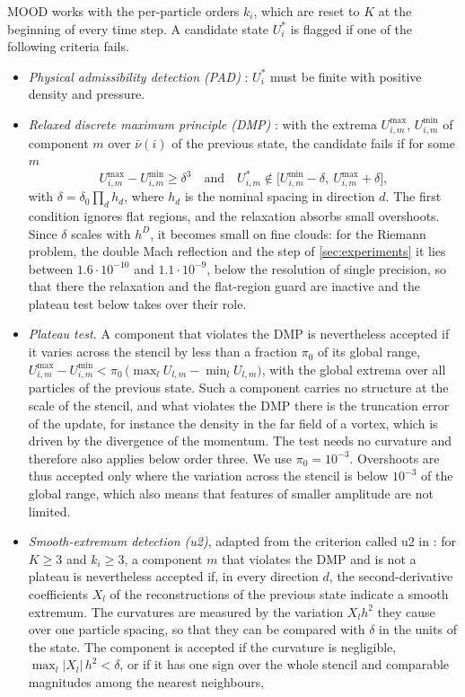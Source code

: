 \documentclass[11pt,a4paper]{article}
\numberwithin{equation}{section}
\newcommand{\cnb}{\bar\nu}
\begin{document}
MOOD works with the per-particle orders $k_i$, which are reset to $K$ at the beginning of every time step. A candidate state $U^*_i$ is flagged if one of the following criteria fails.
\begin{itemize}
\item \emph{Physical admissibility detection (PAD)} \cite{Diot2012,Diot2013}: $U^*_i$ must be finite with positive density and pressure.
\item \emph{Relaxed discrete maximum principle (DMP)} \cite{Clain2011,Diot2013,Dumbser2014}: with the extrema $U^{\max}_{i,m}$, $U^{\min}_{i,m}$ of component $m$ over $\cnb(i)$ of the previous state, the candidate fails if for some $m$
\begin{equation}\label{eq:dmp}
U^{\max}_{i,m}-U^{\min}_{i,m}\ge\delta^3\quad\text{and}\quad U^*_{i,m}\notin\big[U^{\min}_{i,m}-\delta,\ U^{\max}_{i,m}+\delta\big],
\end{equation}
with $\delta=\delta_0\prod_dh_d$, where $h_d$ is the nominal spacing in direction $d$. The first condition ignores flat regions, and the relaxation absorbs small overshoots. Since $\delta$ scales with $h^D$, it becomes small on fine clouds: for the Riemann problem, the double Mach reflection and the step of \cref{sec:experiments} it lies between $1.6\cdot10^{-10}$ and $1.1\cdot10^{-9}$, below the resolution of single precision, so that there the relaxation and the flat-region guard are inactive and the plateau test below takes over their role.
\item \emph{Plateau test.} A component that violates the DMP is nevertheless accepted if it varies across the stencil by less than a fraction $\pi_0$ of its global range, $U^{\max}_{i,m}-U^{\min}_{i,m}<\pi_0\,\big(\max_lU_{l,m}-\min_lU_{l,m}\big)$, with the global extrema over all particles of the previous state. Such a component carries no structure at the scale of the stencil, and what violates the DMP there is the truncation error of the update, for instance the density in the far field of a vortex, which is driven by the divergence of the momentum. The test needs no curvature and therefore also applies below order three. We use $\pi_0=10^{-3}$. Overshoots are thus accepted only where the variation across the stencil is below $10^{-3}$ of the global range, which also means that features of smaller amplitude are not limited.
\item \emph{Smooth-extremum detection (u2)}, adapted from the criterion called u2 in \cite{Diot2012,Diot2013}: for $K\ge3$ and $k_i\ge3$, a component $m$ that violates the DMP and is not a plateau is nevertheless accepted if, in every direction $d$, the second-derivative coefficients $X_l$ of the reconstructions of the previous state indicate a smooth extremum. The curvatures are measured by the variation $X_lh^2$ they cause over one particle spacing, so that they can be compared with $\delta$ in the units of the state. The component is accepted if the curvature is negligible, $\max_l|X_l|\,h^2<\delta$, or if it has one sign over the whole stencil and comparable magnitudes among the nearest neighbours,

\end{itemize}
\end{document}
